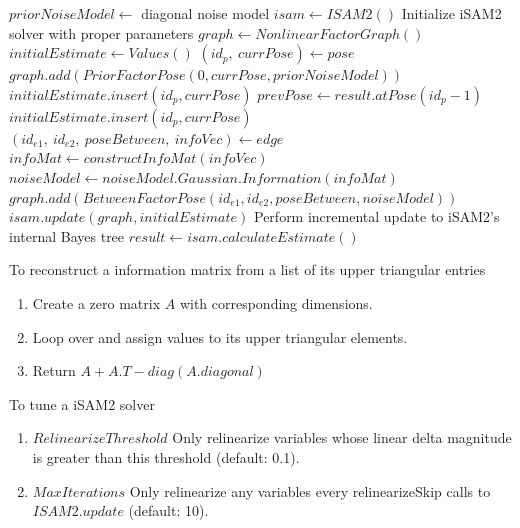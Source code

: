 \documentclass[11pt, oneside, letter]{article}
\begin{document}
\begin{enumerate}[A.]
\begin{algorithm}[H]
\begin{algorithmic}
    \State $priorNoiseModel \gets $ diagonal noise model
    \State $isam \gets ISAM2()$ \Comment Initialize iSAM2 solver with proper parameters
        \State $graph \gets NonlinearFactorGraph()$
        \State $initialEstimate \gets Values()$
        \State $(id_p,\ currPose) \gets pose$
            \State $graph.add(PriorFactorPose(0, currPose, priorNoiseModel))$
            \State $initialEstimate.insert(id_p, currPose)$
        \Else 
            \State $prevPose \gets result.atPose(id_p - 1)$
            \State $initialEstimate.insert(id_p, currPose)$
                \State $(id_{e1},\ id_{e2},\ poseBetween,\ infoVec) \gets edge$
                    \State $infoMat \gets constructInfoMat(infoVec)$
                    \State $noiseModel \gets noiseModel.Gaussian.Information(infoMat)$
                    \State $graph.add(BetweenFactorPose(id_{e1}, id_{e2}, poseBetween, noiseModel))$
                \EndIf
            \EndFor
        \EndIf
    \EndFor
    \State $isam.update(graph, initialEstimate)$ \Comment Perform incremental update to iSAM2's internal Bayes tree
    \State $result \gets isam.calculateEstimate()$
    
    \end{algorithmic}
\end{algorithm}

To reconstruct a information matrix from a list of its upper triangular entries
\begin{enumerate}
    \item Create a zero matrix $A$ with corresponding dimensions.
    \item Loop over and assign values to its upper triangular elements.
    \item Return $A + A.T - diag(A.diagonal)$
\end{enumerate}

To tune a iSAM2 solver
\begin{enumerate}[1.]
    \item $RelinearizeThreshold$ Only relinearize variables whose linear delta magnitude is greater than this threshold (default: 0.1).
    \item $MaxIterations$ Only relinearize any variables every relinearizeSkip calls to $ISAM2.update$  (default: 10).
\end{enumerate}


\end{enumerate}
\end{document}
